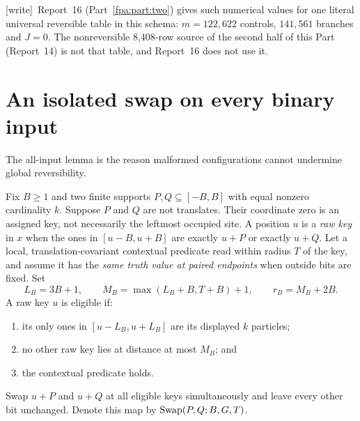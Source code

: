 \documentclass[11pt,a4paper]{article}
\numberwithin{equation}{section}
\newcommand{\wtag}{\textup{[write]}}
\begin{document}
\wtag\ Report~16 (Part~\ref{fpa:part:two}) gives such numerical values for one literal universal reversible table in this schema: $m=122{,}622$ controls, $141{,}561$ branches and $J=0$. The nonreversible 8,408-row source of the second half of this Part (Report~14) is not that table, and Report~16 does not use it.

\section{An isolated swap on every binary input}\label{fpa:sec:swap}
The all-input lemma is the reason malformed configurations cannot undermine
global reversibility.

Fix $B\ge1$ and two finite supports $P,Q\subseteq[-B,B]$ with equal nonzero
cardinality $k$. Suppose $P$ and $Q$ are not translates. Their coordinate zero
is an assigned key, not necessarily the leftmost occupied site. A position $u$
is a \emph{raw key} in $x$ when the ones in $[u-B,u+B]$ are exactly $u+P$ or
exactly $u+Q$. Let a local, translation-covariant contextual predicate read
within radius $T$ of the key, and assume it has the \emph{same truth value at
paired endpoints} when outside bits are fixed. Set
\[
 L_B=3B+1,\qquad M_B=\max(L_B+B,T+B)+1,\qquad r_B=M_B+2B. \tag{2}\label{fpa:eq:swapconst}
\]
A raw key $u$ is eligible if:
\begin{enumerate}
\item its only ones in $[u-L_B,u+L_B]$ are its displayed $k$ particles;
\item no other raw key lies at distance at most $M_B$; and
\item the contextual predicate holds.
\end{enumerate}
Swap $u+P$ and $u+Q$ at all eligible keys simultaneously and leave every other
bit unchanged. Denote this map by $\operatorname{Swap}(P,Q;B,G,T)$.
\end{document}
